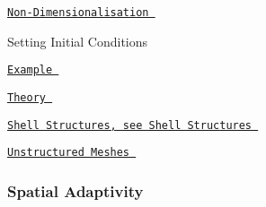 \begin{DoxyItemize}
\item  \href{ ../../solid/solid_theory/html/index.html#non-dim_solid }{\tt Non-\/\-Dimensionalisation }  
\item  Setting Initial Conditions   
\begin{DoxyItemize}
\item  \href{ ../../solid/disk_oscillation/html/index.html }{\tt Example }  
\item  \href{ ../../solid/solid_theory/html/index.html#Solid_IC }{\tt Theory }  
\end{DoxyItemize} 
\item  \href{ ../../index/html/index.html#S.ShellStructures }{\tt Shell Structures, see Shell Structures }  
\item  \href{ ../../solid/unstructured_solid/html/index.html }{\tt Unstructured Meshes }  
\end{DoxyItemize} \subsubsection*{ Spatial Adaptivity }

